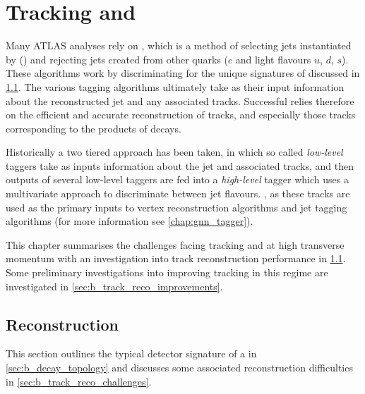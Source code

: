 \chapter{Tracking and \btagging}\label{chap:tracking}

Many ATLAS analyses rely on \btagging, which is a method of selecting jets instantiated by \bquarks (\bjets) and rejecting jets created from other quarks ($c$ and light flavours $u$, $d$, $s$).
These \btagging algorithms work by discriminating for the unique signatures of \bjets discussed in \cref{sec:b_had_reco}.
The various tagging algorithms ultimately take as their input information about the reconstructed jet and any associated tracks.
Successful \btagging relies therefore on the efficient and accurate reconstruction of tracks, and especially those tracks corresponding to the products of \bhadron decays.

Historically a two tiered approach has been taken, in which so called \textit{low-level} taggers take as inputs information about the jet and associated tracks, and then outputs of several low-level taggers are fed into a \textit{high-level} tagger which uses a multivariate approach to discriminate between jet flavours.
, as these tracks are used as the primary inputs to vertex reconstruction algorithms and jet tagging algorithms (for more information see \cref{chap:gnn_tagger}).

This chapter summarises the challenges facing tracking and \btagging at high transverse momentum with an investigation into track reconstruction performance in \cref{sec:b_had_reco}.
Some preliminary investigations into improving tracking in this regime are investigated in \cref{sec:b_track_reco_improvements}.


\section{\bhadron Reconstruction}
\label{sec:b_had_reco}

This section outlines the typical detector signature of a \bhadron in \cref{sec:b_decay_topology} and discusses some associated reconstruction difficulties in \cref{sec:b_track_reco_challenges}.

